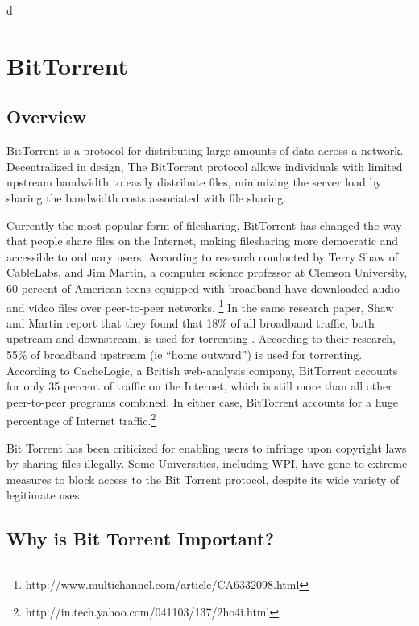 d\documentclass[a4paper,12pt]{report}
\begin{document}
\chapter{BitTorrent}
\section{Overview}
BitTorrent is a protocol for distributing large amounts of data across a network. 
Decentralized in design, The BitTorrent protocol allows individuals with limited upstream bandwidth to easily distribute files, minimizing the server load by sharing the bandwidth costs associated with file sharing. 

Currently the most popular form of filesharing, BitTorrent has changed the way that people share files on the Internet, making filesharing more democratic and accessible to ordinary users.
According to research conducted by Terry Shaw of CableLabs, and Jim Martin, a computer science professor at Clemson University, 60 percent of American teens equipped with broadband have downloaded audio and video files over peer-to-peer networks. \footnote {http://www.multichannel.com/article/CA6332098.html}
In the same research paper, Shaw and Martin report that they found that 18\% of all broadband traffic, both upstream and downstream, is used for torrenting . 
According to their research, 55\% of broadband upstream (ie “home outward”) is used for torrenting.
According to CacheLogic, a British web-analysis company, BitTorrent accounts for only 35 percent of traffic on the Internet, which is still more than all other peer-to-peer programs combined.  
In either case, BitTorrent accounts for a huge percentage of Internet traffic.\footnote {http://in.tech.yahoo.com/041103/137/2ho4i.html}

Bit Torrent has been criticized for enabling users to infringe upon copyright laws by sharing files illegally. Some Universities, including WPI, have gone to extreme measures to block access to the Bit Torrent protocol, despite its wide variety of legitimate uses. 


\section{Why is Bit Torrent Important?}
\end{document}
